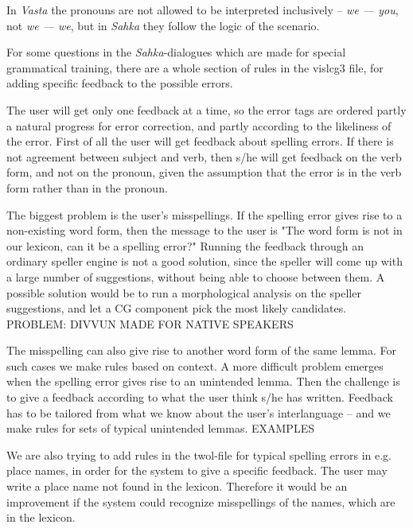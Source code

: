 \documentclass[11pt]{article}
\begin{document}
In \textit{Vasta} the pronouns are not allowed to be interpreted inclusively -- \textit{we — you}, not \textit{we — we}, but in \textit{Sahka} they follow the logic of the scenario.

For some questions in the \textit{Sahka}-dialogues which are made for special grammatical training, there are a whole section of rules in the vislcg3 file, for adding specific feedback to the possible errors.

The user will get only one feedback at a time, so the error tags are ordered partly a natural progress for error correction, and partly according to the likeliness of the error. First of all the user will get feedback about spelling errors. If there is not agreement between subject and verb, then s/he will get feedback on the verb form, and not on the pronoun, given the assumption that the error is in the verb form rather than in the pronoun.

The biggest problem is the user's misspellings. If the spelling error gives rise to a non-existing word form, then the message to the user is "The word form is not in our lexicon, can it be a spelling error?" 
Running the feedback through an ordinary speller engine is not a good solution, since the speller will come up with a large number of suggestions, without being able to choose between them. A possible solution would be to run a morphological analysis on the speller suggestions, and let a CG component pick the most likely candidates. PROBLEM: DIVVUN MADE FOR NATIVE SPEAKERS

The misspelling can also give rise to another word form of the same lemma. For such cases we make rules based on context. A more difficult problem emerges when the spelling error gives rise to an unintended lemma. Then the challenge is to give a feedback according to what the user think s/he has written. Feedback has to be tailored from what we know about the user’s interlanguage – and we make rules for sets of typical unintended lemmas. EXAMPLES

We are also trying to add rules in the twol-file for typical spelling errors in e.g. place names, in order for the system to give a specific feedback. The user may write a place name not found in the lexicon. Therefore it would be an improvement if the system could recognize misspellings of the names, which are in the lexicon.
\end{document}
